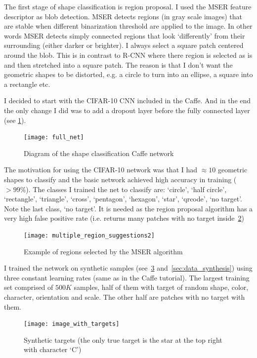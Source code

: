 \documentclass{article} %
\begin{document}
The first stage of shape classification is region proposal. I used the MSER feature
descriptor as blob detection. MSER detects regions (in gray scale images) that are
stable when different binarization threshold are applied to the image. In other
words MSER detects simply connected regions that look `differently' from their
surrounding (either darker or brighter). I always select a square patch centered
around the blob. This is in contrast to R-CNN where there region is selected as is
and then stretched into a square patch. The reason is that I don't want the geometric
shapes to be distorted, e.g. a circle to turn into an ellipse, a square into a rectangle
etc.

I decided to start with the CIFAR-10 CNN included in the Caffe. And in the end the
only change I did was to add a dropout layer before the fully connected layer 
(see \cref{fig:full_net}).
\begin{figure}[h]
	\centering
	\texttt{[image: full\_net]}
	\caption{Diagram of the shape classification Caffe network}
	\label{fig:full_net}
\end{figure}
The motivation for using the CIFAR-10 network was that I had $\approx10$ geometric
shapes to classify and the basic network achieved high accuracy in training ($>99\%$).
The classes I trained the net to classify are: `circle', `half circle', `rectangle',
`triangle', `cross', `pentagon', `hexagon', `star', `qrcode', `no target'. Note the
last class, `no target'. It is needed as the region proposal algorithm has a very high
false positive rate (i.e. returns many patches with no target inside~\cref{fig:multiple_region_suggestions2})
\begin{figure}[h]
	\centering
	\texttt{[image: multiple\_region\_suggestions2]}
	\caption{Example of regions selected by the MSER algorithm}
	\label{fig:multiple_region_suggestions2}
\end{figure}
I trained the network on synthetic samples (see~\cref{fig:image_with_targets} and~\cref{sec:data_synthesis}) using three
constant learning rates (same as in the Caffe tutorial). The largest training set comprised of
$500K$ samples, half of them with target of random shape, color, character, orientation and scale.
The other half are patches with no target with them.
\begin{figure}[h]
	\centering
	\texttt{[image: image\_with\_targets]}
	\caption{Synthetic targets (the only true target is the star at the top right with character `C')}
	\label{fig:image_with_targets}
\end{figure}
\end{document}
